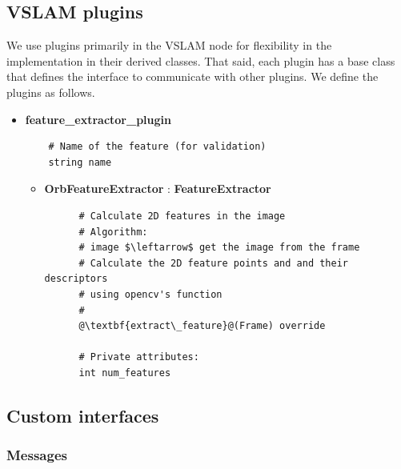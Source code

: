 \subsection{VSLAM plugins}

We use plugins primarily in the VSLAM node for flexibility in the implementation in their derived classes.
That said, each plugin has a base class that defines the interface to communicate with other plugins.
We define the plugins as follows.

\begin{itemize}
  \item \textbf{feature\_extractor\_plugin}
  
  \begin{verbatim}
    # Name of the feature (for validation)
    string name
  \end{verbatim}

  \begin{itemize}
    \item {\textbf{OrbFeatureExtractor} : \textbf{FeatureExtractor}}
    \begin{lstlisting}
      # Calculate 2D features in the image
      # Algorithm:
      # image $\leftarrow$ get the image from the frame
      # Calculate the 2D feature points and and their descriptors 
      # using opencv's function
      # 
      @\textbf{extract\_feature}@(Frame) override

      # Private attributes:
      int num_features
    \end{lstlisting}
    
  \end{itemize}
\end{itemize}

\subsection{Custom interfaces}

\subsubsection{Messages}

